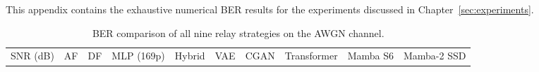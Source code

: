 This appendix contains the exhaustive numerical BER results for the experiments discussed in Chapter~\ref{sec:experiments}.

\begin{longtable}[]{@{}
  >{\raggedright\arraybackslash}p{}
  >{\raggedright\arraybackslash}p{}
  >{\raggedright\arraybackslash}p{}
  >{\raggedright\arraybackslash}p{}
  >{\raggedright\arraybackslash}p{}
  >{\raggedright\arraybackslash}p{}
  >{\raggedright\arraybackslash}p{}
  >{\raggedright\arraybackslash}p{}
  >{\raggedright\arraybackslash}p{}
  >{\raggedright\arraybackslash}p{}@{}}
\caption{BER comparison of all nine relay strategies on the AWGN channel.}\label{tbl:table1}\tabularnewline
\toprule\noalign{}
\begin{minipage}[b]{\linewidth}\raggedright
SNR (dB)
\end{minipage} & \begin{minipage}[b]{\linewidth}\raggedright
AF
\end{minipage} & \begin{minipage}[b]{\linewidth}\raggedright
DF
\end{minipage} & \begin{minipage}[b]{\linewidth}\raggedright
MLP (169p)
\end{minipage} & \begin{minipage}[b]{\linewidth}\raggedright
Hybrid
\end{minipage} & \begin{minipage}[b]{\linewidth}\raggedright
VAE
\end{minipage} & \begin{minipage}[b]{\linewidth}\raggedright
CGAN
\end{minipage} & \begin{minipage}[b]{\linewidth}\raggedright
Transformer
\end{minipage} & \begin{minipage}[b]{\linewidth}\raggedright
Mamba S6
\end{minipage} & \begin{minipage}[b]{\linewidth}\raggedright
Mamba-2 SSD
\end{minipage} \\

\end{longtable}
